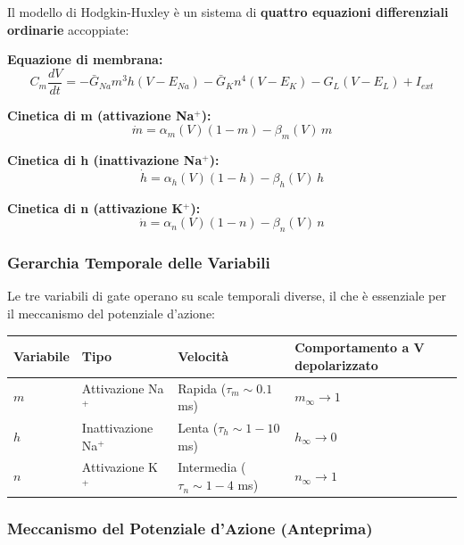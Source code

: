 Il modello di Hodgkin-Huxley è un sistema di \textbf{quattro equazioni differenziali ordinarie} accoppiate:

\textbf{Equazione di membrana:}
\begin{equation}
C_m \frac{dV}{dt} = -\bar{G}_{Na} m^3 h (V - E_{Na}) - \bar{G}_K n^4 (V - E_K) - G_L (V - E_L) + I_{ext}
\end{equation}

\textbf{Cinetica di m (attivazione Na$^+$):}
\begin{equation}
\dot{m} = \alpha_m(V)(1-m) - \beta_m(V) \, m
\end{equation}

\textbf{Cinetica di h (inattivazione Na$^+$):}
\begin{equation}
\dot{h} = \alpha_h(V)(1-h) - \beta_h(V) \, h
\end{equation}

\textbf{Cinetica di n (attivazione K$^+$):}
\begin{equation}
\dot{n} = \alpha_n(V)(1-n) - \beta_n(V) \, n
\end{equation}

\subsubsection{Gerarchia Temporale delle Variabili}

Le tre variabili di gate operano su scale temporali diverse, il che è essenziale per il meccanismo del potenziale d'azione:

\begin{table}[htbp]
    \centering
    \renewcommand{\arraystretch}{1.3}
    \begin{tabularx}{\textwidth}{|l|X|X|X|}
    \hline
    \textbf{Variabile} & \textbf{Tipo} & \textbf{Velocità} & \textbf{Comportamento a V depolarizzato} \\
    \hline
    $m$ & Attivazione Na$^+$ & Rapida ($\tau_m \sim 0.1$ ms) & $m_\infty \to 1$ \\
    $h$ & Inattivazione Na$^+$ & Lenta ($\tau_h \sim 1{-}10$ ms) & $h_\infty \to 0$ \\
    $n$ & Attivazione K$^+$ & Intermedia ($\tau_n \sim 1{-}4$ ms) & $n_\infty \to 1$ \\
    \hline
    \end{tabularx}
\end{table}

\subsubsection{Meccanismo del Potenziale d'Azione (Anteprima)}

